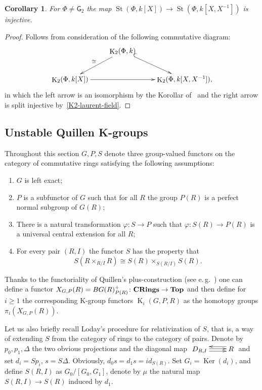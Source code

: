 \documentclass[oneside, 8pt]{amsart}
\newtheorem{corollary}{Corollary}
\theoremstyle{remark}
\theoremstyle{definition}
\DeclareMathOperator{\Ker}{Ker}
\DeclareMathOperator{\St}{St}
\DeclareMathOperator{\K}{K}
\newcommand{\catname}[1]{{\normalfont\textbf{#1}}} %
\newcommand{\rG}{\mathsf{G}}
\numberwithin{equation}{section}
\begin{document}
\begin{corollary} \label{field-injectivity} For $\Phi\neq\rG_2$ the map $\St(\Phi, k[X]) \to \St(\Phi, k[X, X^{-1}])$ is injective. \end{corollary}
\begin{proof} Follows from consideration of the following commutative diagram:
\[\xymatrix{ & \K_2(\Phi, k) \ar[dl]_{\cong} \ar@{^{(}->}[dr] & \\
               \K_2(\Phi, k[X]) \ar[rr] &               & \K_2(\Phi, k[X, X^{-1}]),} \]
in which the left arrow is an isomorphism by the Korollar of~\cite[Satz~1]{Re75} and the right arrow is split injective by~\cref{K2-laurent-field}. \end{proof}

\subsection{Unstable Quillen K-groups} \label{sec:quillen}
Throughout this section $G, P, S$ denote three group-valued functors on the category of commutative rings satisfying the following assumptions:
\begin{enumerate} [label=(A\arabic*)]
 \item \label{req:left-exact} $G$ is left exact;
 \item \label{req:subfunc} $P$ is a subfunctor of $G$ such that for all $R$ the group $P(R)$ is a perfect normal subgroup of $G(R)$;
 \item \label{req:uce} There is a natural transformation $\varphi \colon S \to P$ such that $ \varphi \colon S(R) \to P(R)$ is a universal central extension for all $R$;
 \item \label{req:coeq} For every pair $(R, I)$ the functor $S$ has the property that \[S(R \times_{R/I} R) \cong S(R) \times_{S(R/I)} S(R).\]
\end{enumerate}

Thanks to the functoriality of Quillen's plus-construction (see e.\,g.~\cite[Proposition~5.2.4]{Ro95}) one can define a functor 
$X_{G, P}(R) = BG(R)^+_{P(R)} \colon \catname{CRings} \to \catname{Top}$ and then define for $i \geq 1$ the corresponding K-group functors $\K_{i}(G, P, R)$ as the homotopy groups $\pi_i(X_{G, P}(R))$.

Let us also briefly recall Loday's procedure for relativization of $S$, that is,
 a way of extending $S$ from the category of rings to the category of pairs.
Denote by $p_0, p_1, \Delta$ the two obvious projections and the diagonal map $\xymatrix{D_{R,I} \ar@<1pt>[r] \ar@<-2.5pt>[r] & \ar@<-4pt>[l] R}$
  and set $d_i = Sp_i$, $s = S\Delta$.
 Obviously, $d_0s = d_1 s = id_{S(R)}$. Set $G_i = \Ker(d_i)$, and define $S(R, I)$ as $ G_0 / [G_0, G_1]$, denote by $\mu$ the natural map $S(R, I) \to S(R)$ induced by $d_1$.
\end{document}
